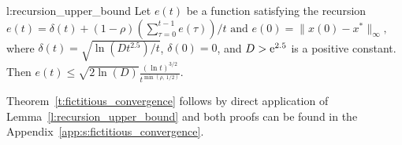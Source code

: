 \begin{replemma}{l:recursion_upper_bound}
  Let $e(t)$ be a function satisfying the recursion
  \(
    e(t) =
    \delta(t) + (1-\rho)(\sum_{\tau=0}^{t-1}e(\tau))/{t}
    \text{ and } e(0)=\|x(0) - x^*\|_{\infty},
  \)
  where \(\delta(t) = \sqrt{\ln(D t^{2.5})/t} \), \(\delta(0) = 0 \),
  and $D > \mathrm{e}^{2.5}$ is a positive constant.  Then
  \(
    e(t) \leq
    \sqrt{2 \ln(D)} \frac{(\ln t)^{3/2}}{t^{\min(\rho,\, 1/2)}}.
  \)
\end{replemma}
Theorem~\ref{t:fictitious_convergence} follows by direct application
of Lemma~\ref{l:recursion_upper_bound} and both proofs can be found
in the Appendix~\ref{app:s:fictitious_convergence}.